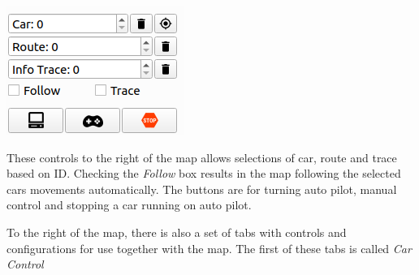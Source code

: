 \documentclass[12pt]{article} %
\begin{document}
\noindent\begin{minipage}{0.25\textwidth}
\noindent \includegraphics[width=\textwidth]{./screens/map_top_right.png}
\end{minipage}
\noindent\begin{minipage}{0.75\textwidth} These controls to the right
of the map allows selections of car, route and trace based on
ID. Checking the {\em Follow} box results in the map following the
selected cars movements automatically. The buttons are for turning
auto pilot, manual control and stopping a car running on auto pilot.
\end{minipage} 

To the right of the map, there is also a set of tabs with controls and
configurations for use together with the map. The first of these tabs
is called {\em Car Control}
\end{document}
